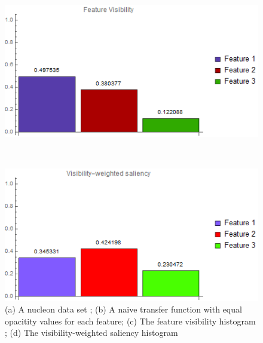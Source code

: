 \begin{figure}
\begin{minipage}{.15\textwidth}
	\subcaption{}
\end{minipage}~
\begin{minipage}{.25\textwidth}
	\includegraphics[width=1\linewidth]{images/nucleon_naive_visibility_chart}
	\subcaption{}
\end{minipage}~
\begin{minipage}{.25\textwidth}
	\includegraphics[width=1\linewidth]{images/nucleon_naive_visibility_saliency_weighted_chart}
	\subcaption{}
\end{minipage}
\caption{(a) A nucleon data set \cite{website:Voreen_datasets_2013}; (b) A naive transfer function with equal opacitity values for each feature; (c) The feature visibility histogram \cite{wang_efficient_2011}; (d) The visibility-weighted saliency histogram}
\label{fig:nucleon_naive}
\end{figure}

